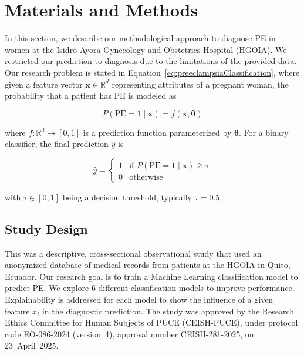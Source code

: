 \documentclass[diagnostics,article,accept,pdftex,moreauthors]{Definitions/mdpi}
\begin{document}


\section{Materials and Methods}
\label{sec:materials-methods}
In this section, we describe our methodological approach to diagnose
\ac{PE} in women at the Isidro Ayora Gynecology and Obstetrics
  {Hospital} (\ac{HGOIA}). %
We restricted our prediction to diagnosis due to the limitations of the provided
data. Our research problem is stated in
Equation~\eqref{eq:preeclampsiaClassification}, where given a feature vector
$\mathbf{x} \in \mathbb{R}^d$ representing  attributes of a
pregnant woman, the probability that a patient has \ac{PE} is modeled
as
\begin{linenomath}
\begin{equation}
  \label{eq:preeclampsiaClassification}
  P(\mathrm{PE} = 1 \mid \mathbf{x}) = f(\mathbf{x}; \boldsymbol{\theta})
\end{equation}
\end{linenomath}
where $f: \mathbb{R}^d \to [0,1]$ is a prediction function
parameterized by $\boldsymbol{\theta}$. For a binary classifier, the
final prediction $\hat{y}$ is
\begin{linenomath}
\begin{equation}
  \hat{y} =
  \begin{cases}
    1 & \text{if } P(\mathrm{PE} = 1 \mid \mathbf{x}) \geq \tau \\
    0 & \text{otherwise}
  \end{cases}
  \label{eq:preeclampsia_decision}
\end{equation}
\end{linenomath}
with $\tau \in [0,1]$ being a decision threshold, typically $\tau =
0.5$.

\subsection{Study Design}
\label{sec:study-design}
This was a descriptive, cross-sectional observational study that used
an anonymized database of medical records from
patients at the \ac{HGOIA} in Quito, Ecuador. Our research goal is to
train a Machine Learning classification model to predict \ac{PE}. We
explore 6 different classification models to improve
performance. Explainability is addressed for each model to show the
influence of a given feature $x_i$ in the diagnostic prediction.
The study was approved by the Research Ethics Committee for Human
Subjects of \ac{PUCE} (CEISH-\ac{PUCE}), under protocol code
EO-086-2024 (version~4), approval number CEISH-281-2025, on
23~April~2025.
\end{document}
